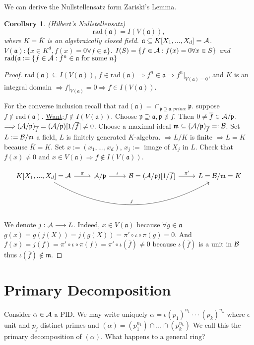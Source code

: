 \documentclass[11pt]{article}
\newtheorem{cor}[thm]{Corollary}
\newcommand{\sca}{{\mathfrak a}}
\newcommand{\scm}{{\mathfrak m}}
\newcommand{\scp}{{\mathfrak p}}
\newcommand{\cala}{{\cal A}}
\newcommand{\calb}{{\cal B}}
\newcommand{\Lrta}{\Longrightarrow}
\newcommand{\lrta}{\longrightarrow}
\begin{document}
We can derive the  Nullstellensatz form Zariski's Lemma. 
\begin{cor}(Hilbert's Nullstellensatz)
$$
\text{rad}(\sca)=I(V(\sca)),
$$ 
where $K=\overline{K}$ is an algebraically closed field. $\sca\subseteq K[X_1,...,X_d]=\cala$. $V(\sca):\{x\in K^d, f(x)=0\forall f\in \sca\}$. $I(S)=\{f\in \cala:f(x)=0\forall x\in S\}$ and $\text{rad}(\sca:=\{f\in \cala:f^n\in \sca \text{ for some } n\}$
\end{cor}
\begin{proof}
$\text{rad}(\sca)\subseteq I(V(\sca))$, $f\in \text{rad}(\sca)\Lrta f^n\in \sca\Lrta f^n|_{V(\sca)=0}$, and $K$ is an integral domain $\Lrta f|_{V(\sca)}=0$$\Lrta f\in I(V(\sca))$. 

For the converse inclusion recall that $\text{rad}(\sca)=\cap_{\scp\supseteq \sca, prime}\scp$. suppose $f\notin  \text{rad}(\sca) $. \underline{Want}:$f\notin I(V(\sca))$. Choose $\scp\supseteq \sca,\scp \not \ni f$. Then $0\neq \overline{f}\in \cala/\scp$. $\Lrta (\cala/\scp)_{\overline{f}}=(\cala/\scp)[1/\overline{f}]\neq 0$. Choose a maximal ideal $\scm\subseteq (\cala/\scp)_{\overline{f}}=:\calb$. Set $L:=\calb/\scm$ a field, $L$ is finitely generated $K$-algebra. $\Lrta L/K $ is finite $\Lrta L=K$ because $\overline{K}=K$. Set $x:=(x_1,...,x_d)$, $x_j:=$ image of $X_j$ in $L$. Check that $f(x)\neq 0\text{ and } x\in V(\sca)\Lrta f\notin I(V(\sca))$. 

 \[
\begin{tikzcd}
K[X_1,...,X_d]=\cala\ar[r,"\pi"]\ar[rrr,bend right,"j"]&\cala/\scp\ar[r,"\iota"]&\calb=(\cala/\scp)[1/\overline{f}]\ar[r,"\pi'"] & L=\calb/\scm=K  
\end{tikzcd}
\]

We denote $j:\cala\lrta L$.
Indeed, $x\in V(\sca)$ because $\forall g\in \sca$ $g(x)=g(j(X))=j(g(X))=\pi'\circ\iota\circ\pi(g)=0$. And $f(x)=j(f)=\pi'\circ\iota\circ\pi(f)=\pi'\circ\iota (\overline{f})\neq 0$ because $\iota(\overline{f})$ is a unit in $\calb$ thus $\iota(\overline{f})\notin\scm$.
\end{proof}

\section{Primary Decomposition}
Consider $\alpha\in \cala$ a PID. We may write uniquely $\alpha=\epsilon (p_1)^{n_1}\cdot \cdot\cdot (p_k)^{n_k}$ where $\epsilon$ unit and $p_j$ distinct  primes and $(\alpha)=(p_1^{n_1})\cap...\cap(p_k^{n_k})$ We call this the primary decomposition of $(\alpha)$. What happens to a general ring?
\end{document}

